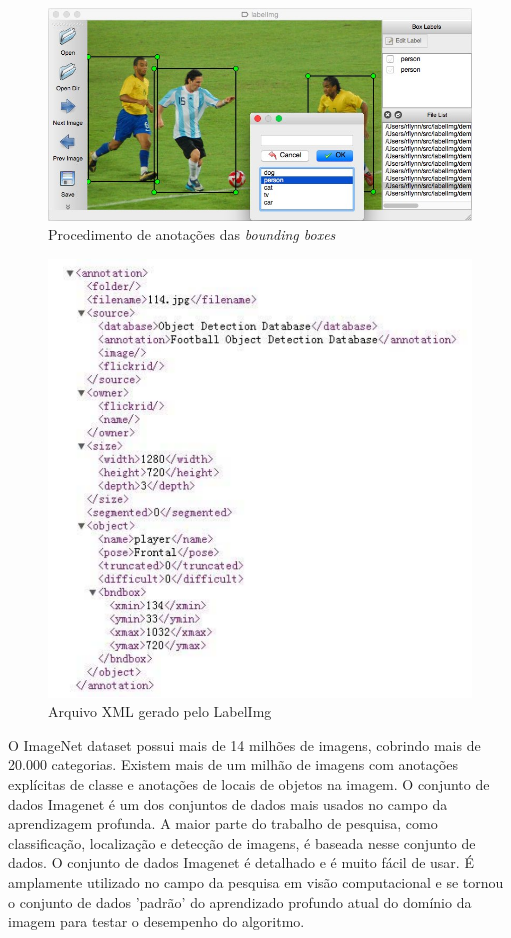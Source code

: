 \begin{figure}[htbp]
	\centering
	\includegraphics[width=0.9\linewidth]{figuras/MachineLearning/labelimg.jpg}
	\caption{Procedimento de anotações das \textit{bounding boxes}}
	\label{fig:labelimg}
\end{figure}

\begin{figure}[htbp]
	\centering
	\includegraphics[width=0.8\linewidth]{figuras/MachineLearning/labelXml.png}
	\caption{Arquivo XML gerado pelo LabelImg}
	\label{fig:labelXml}
\end{figure}

O ImageNet dataset \cite{deng2009imagenet} possui mais de 14 milhões de imagens, cobrindo mais de 20.000 categorias. Existem mais de um milhão de imagens com anotações explícitas de classe e anotações de locais de objetos na imagem. O conjunto de dados Imagenet é um dos conjuntos de dados mais usados no campo da aprendizagem profunda. A maior parte do trabalho de pesquisa, como classificação, localização e detecção de imagens, é baseada nesse conjunto de dados. O conjunto de dados Imagenet é detalhado e é muito fácil de usar. É amplamente utilizado no campo da pesquisa em visão computacional e se tornou o conjunto de dados 'padrão' do aprendizado profundo atual do domínio da imagem para testar o desempenho do algoritmo. \cite{zhou2017application}

